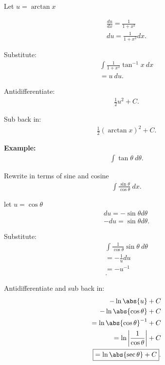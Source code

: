 \documentclass{report}
\begin{document}
  \bigbreak \noindent \bigbreak \noindent
  Let $u=\arctan{x}$ 

  \begin{align*}
    \frac{du}{dx} = \frac{1}{1+x^{2}} \\
     du = \frac{1}{1+x^{2}}dx
  .\end{align*}

  \bigbreak \noindent \bigbreak \noindent
  Substitute:
  \begin{align*}
    \int \frac{1}{1+x^{2}}\tan^{-1}{x}\ dx \\ 
    = u\ du
  .\end{align*}

  \bigbreak \noindent \bigbreak \noindent
  Antidifferentiate:
  \begin{align*}
    \frac{1}{2}u^{2} + C 
  .\end{align*}

  \bigbreak \noindent \bigbreak \noindent
  Sub back in:
  \begin{align*}
    \frac{1}{2}(\arctan{x})^{2} + C
  .\end{align*}

  \pagebreak \bigbreak \noindent
  \bigbreak \noindent 
  \begin{mdframed}
    \textbf{Example: }
    \begin{align*}
      \int \tan{\theta }\ d\theta 
    .\end{align*}
  \end{mdframed}

  \bigbreak \noindent \bigbreak \noindent
  Rewrite in terms of sine and cosine
  \begin{align*}
    \int \frac{\sin{\theta }}{\cos{\theta }}\ dx
  .\end{align*}

  \bigbreak \noindent \bigbreak \noindent
  let $u = \cos{\theta }$
  \begin{align*}
    du = -\sin{\theta }d\theta  \\
    -du = \sin{\theta }d\theta 
  .\end{align*}

  \bigbreak \noindent \bigbreak \noindent
  Substitute:
  \begin{align*}
    \int \frac{1}{\cos{\theta }}\sin{\theta }\ d\theta  \\
    = -\frac{1}{u}du \\
    = -u^{-1} \\
  .\end{align*}

  \bigbreak \noindent \bigbreak \noindent
  Antidifferentiate and sub back in: 
  \begin{align*}
    -\ln{\abs{u}} + C \\
    - \ln{\abs{\cos{\theta }}} + C  \\
    = \ln{\abs{\cos{\theta }}}^{-1} + C  \\
    = \ln{\bigg|{\frac{1}{\cos{\theta }}}\bigg|} + C \\
    \boxed{= \ln{\abs{\sec{\theta }}} + C}
  .\end{align*}
\end{document}

